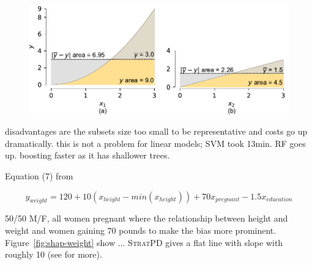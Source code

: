 \documentclass[twoside,11pt]{article}
\newcommand{\figref}[1]{Figure~\ref{#1}}
\newcommand{\spd}{\fontfamily{cmr}\textsc{\small StratPD}}
\begin{document}
\begin{figure}[htbp]
\begin{center}
\includegraphics[scale=0.65]{images/from-mean-auc.pdf}
\label{fig:combined-area}
\end{center}
\end{figure}

 disadvantages are the subsets  size too small to be representative and costs go up dramatically. this is not a problem for linear models; SVM took 13min. RF goes up. boosting faster as it has shallower trees.
 
Equation (7) from \cite{stratpd} 

\begin{equation}\label{eq:weight}
y_{weight}  = 120 + 10(x_{height} - min(x_{height})) + 70x_{pregnant} - 1.5x_{education}
\end{equation}

50/50 M/F, all women pregnant
where the relationship between height and weight and women gaining 70 pounds to make the bias more prominent. \figref{fig:shap-weight} show ...  \spd{} gives a flat line with slope with roughly 10 (see \cite{stratpd} for more).
\end{document}
